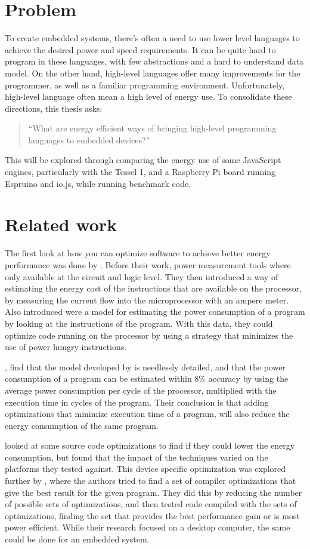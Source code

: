 \section{Problem}
To create embedded systems, there’s often a need to use lower level languages to achieve the desired power and speed requirements.
It can be quite hard to program in these languages, with few abstractions and a hard to understand data model.
On the other hand, high-level languages offer many improvements for the programmer, as well as a familiar programming environment.
Unfortunately, high-level language often mean a high level of energy use.
To consolidate these directions, this thesis asks: 
\begin{quote}
``What are energy efficient ways of bringing high-level programming languages to embedded devices?''
\end{quote}

This will be explored through comparing the energy use of some JavaScript engines, particularly with the Tessel 1, and a Raspberry Pi board running Espruino and io.js, while running benchmark code.


\section{Related work}
The first look at how you can optimize software to achieve better energy performance was done by \citet{tiwari94}.
Before their work, power measurement tools where only available at the circuit and logic level.
They then introduced a way of estimating the energy cost of the instructions that are available on the processor, by measuring the current flow into the microprocessor with an ampere meter.
Also introduced were a model for estimating the power consumption of a program by looking at the instructions of the program.
With this data, they could optimize code running on the processor by using a strategy that minimizes the use of power hungry instructions.

\citet{russell98}, find that the model developed by \citeauthor{tiwari94} is needlessly detailed, and that the power consumption of a program can be estimated within 8\% accuracy by using the average power consumption per cycle of the processor, multiplied with the execution time in cycles of the program.
Their conclusion is that adding optimizations that minimize execution time of a program, will also reduce the energy consumption of the same program.

\citet{ortiz08} looked at some source code optimizations to find if they could lower the energy consumption, but found that the impact of the techniques varied on the platforms they tested against.
This device specific optimization was explored further by \citet{delima13}, where the authors tried to find a set of compiler optimizations that give the best result for the given program.
They did this by reducing the number of possible sets of optimizations, and then tested code compiled with the sets of optimizations, finding the set that provides the best performance gain or is most power efficient.
While their research focused on a desktop computer, the same could be done for an embedded system.

